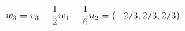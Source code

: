 \documentclass[preview]{standalone}
\begin{document}
\begin{align*}
\special{dvisvgm:raw <g id='unique000'>}w_3=v_3-\frac12w_1-\frac16u_2=(-2/3,2/3,2/3)\special{dvisvgm:raw </g>}
\end{align*}
\end{document}
